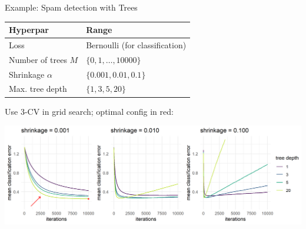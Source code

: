 \documentclass[11pt,compress,t,notes=noshow, xcolor=table]{beamer}
\begin{document}
\begin{vbframe}{Example: Spam detection with Trees} 







%


\begin{table}[]
\footnotesize
\centering
\begin{tabular}{l|l}
Hyperpar     & Range                         \\
\hline
Loss        & Bernoulli (for classification) \\
Number of trees $M$ & $\{0, 1,\dots,10000\}$              \\
Shrinkage $\alpha$     & $\{0.001, 0.01, 0.1\}$           \\
Max. tree depth     & $\{1, 3, 5, 20\}$
\end{tabular}
\end{table}

\vfill
Use 3-CV in grid search; optimal config in red:




\begin{center}
\includegraphics[width=\textwidth]{figure/gbm_spam.png}
\end{center}


\end{vbframe}
\end{document}
